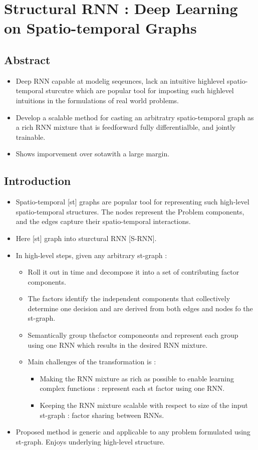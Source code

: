 \documentclass{article}
\begin{document}
\section{Structural RNN : Deep Learning on Spatio-temporal Graphs}
\cite{DBLP:journals/corr/JainZSS15}
\subsection{Abstract}
\begin{itemize}
\item Deep RNN capable at modelig seqeunces, lack an intuitive highlevel spatio-temporal sturcutre which are popular tool for imposting such highlevel intuitions in the formulations of real world problems.
\item Develop a scalable method for casting an arbitratry spatio-temporal graph as a rich RNN mixture that is feedforward fully differentialble, and jointly trainable.
\item Shows imporvement over sotawith a large margin.
\end{itemize}

\subsection{Introduction}
\begin{itemize}
\item Spatio-temporal [st] graphs are popular tool for representing such high-level spatio-temporal structures. The nodes represent the Problem components, and the edges capture their spatio-temporal interactions.
\item Here [st] graph into sturctural RNN [S-RNN].
\item In high-level steps, given any arbitrary st-graph :
  \begin{itemize}
  \item Roll it out in time and decompose it into a set of contributing factor components.
  \item The factors identify the independent components that collectively determine one decision and are derived from both edges and nodes fo the st-graph.
  \item Semantically group thefactor componeonts and represent each group using one RNN which results in the desired RNN mixture.
  \item Main challenges of the transformation is :
    \begin{itemize}
    \item Making the RNN mixture as rich as possible to enable learning complex functions : represent  each st factor using one RNN.
    \item Keeping the RNN mixture scalable with respect to size of the input st-graph : factor sharing between RNNs.
    \end{itemize}
  \end{itemize}
\item Proposed method is generic and applicable to any problem formulated using st-graph. Enjoys underlying high-level structure.
\end{itemize}
\end{document}
